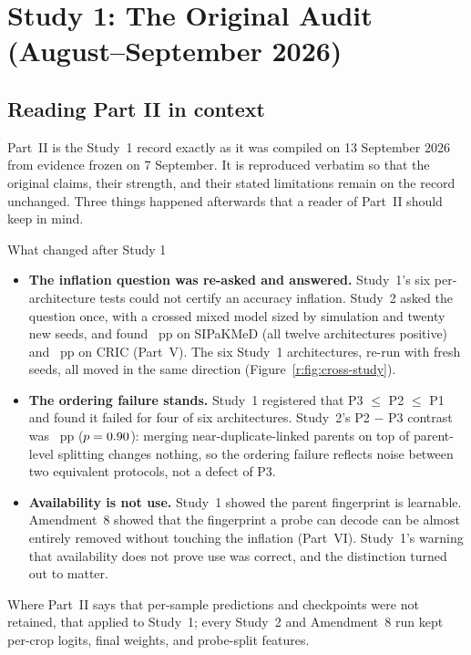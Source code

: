 \part{Study 1: The Original Audit (August--September 2026)}

\chapter*{Reading Part II in context}

Part~II is the Study~1 record exactly as it was compiled on 13 September 2026 from evidence frozen on 7 September. It is
reproduced verbatim so that the original claims, their strength, and their stated limitations remain on the record
unchanged. Three things happened afterwards that a reader of Part~II should keep in mind.

\begin{keybox}{What changed after Study 1}
\begin{itemize}[leftmargin=1.4em]
\item \textbf{The inflation question was re-asked and answered.} Study~1's six per-architecture tests could not certify an
accuracy inflation. Study~2 asked the question once, with a crossed mixed model sized by simulation and twenty new seeds,
and found \HoneEst~pp on SIPaKMeD (all twelve architectures positive) and \HtwoEst~pp on CRIC (Part~V). The six Study~1
architectures, re-run with fresh seeds, all moved in the same direction (Figure~\ref{r:fig:cross-study}).
\item \textbf{The ordering failure stands.} Study~1 registered that P3 $\leq$ P2 $\leq$ P1 and found it failed for four of
six architectures. Study~2's P2 $-$ P3 contrast was \PtwoPthreeEst~pp ($p=0.90$): merging near-duplicate-linked
parents on top of parent-level splitting changes nothing, so the ordering failure reflects noise between two equivalent
protocols, not a defect of P3.
\item \textbf{Availability is not use.} Study~1 showed the parent fingerprint is learnable. Amendment~8 showed that the
fingerprint a probe can decode can be almost entirely removed without touching the inflation (Part~VI). Study~1's
warning that availability does not prove use was correct, and the distinction turned out to matter.
\end{itemize}
\end{keybox}

Where Part~II says that per-sample predictions and checkpoints were not retained, that applied to Study~1; every
Study~2 and Amendment~8 run kept per-crop logits, final weights, and probe-split features.

